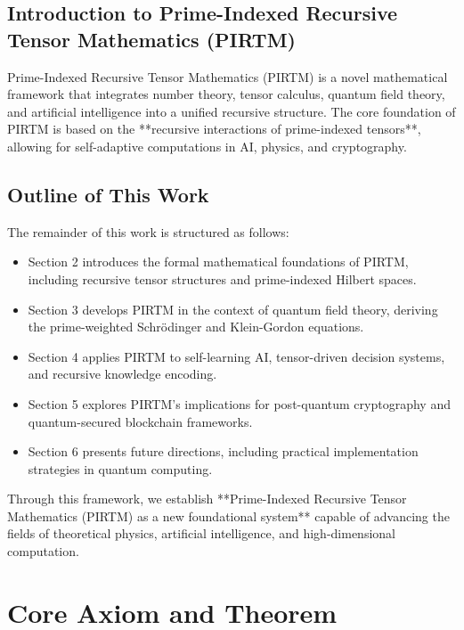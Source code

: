\documentclass{article}
\theoremstyle{plain}
\begin{document}
\subsection{Introduction to Prime-Indexed Recursive Tensor Mathematics (PIRTM)}

Prime-Indexed Recursive Tensor Mathematics (PIRTM) is a novel mathematical framework that integrates number theory, tensor calculus, quantum field theory, and artificial intelligence into a unified recursive structure. The core foundation of PIRTM is based on the **recursive interactions of prime-indexed tensors**, allowing for self-adaptive computations in AI, physics, and cryptography. 

\subsection{Outline of This Work}
The remainder of this work is structured as follows:
\begin{itemize}
    \item Section 2 introduces the formal mathematical foundations of PIRTM, including recursive tensor structures and prime-indexed Hilbert spaces.
    \item Section 3 develops PIRTM in the context of quantum field theory, deriving the prime-weighted Schrödinger and Klein-Gordon equations.
    \item Section 4 applies PIRTM to self-learning AI, tensor-driven decision systems, and recursive knowledge encoding.
    \item Section 5 explores PIRTM’s implications for post-quantum cryptography and quantum-secured blockchain frameworks.
    \item Section 6 presents future directions, including practical implementation strategies in quantum computing.
\end{itemize}

\noindent Through this framework, we establish **Prime-Indexed Recursive Tensor Mathematics (PIRTM) as a new foundational system** capable of advancing the fields of theoretical physics, artificial intelligence, and high-dimensional computation.


\section{Core Axiom and Theorem}
\end{document}
